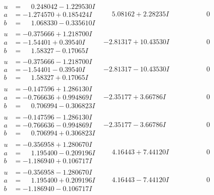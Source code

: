\documentclass[1p]{elsarticle_modified}
\theoremstyle{definition}
\begin{document}
$$\begin{array}{c|c|c}
\begin{aligned}
u &= \phantom{-}0.248042 - 1.229530 I \\
a &= -1.274570 + 0.185424 I \\
b &= \phantom{-}1.068330 - 0.335610 I\end{aligned}
 & \phantom{-}5.08162 + 2.28235 I & \phantom{-0.000000 } 0 \\ \hline\begin{aligned}
u &= -0.375666 + 1.218700 I \\
a &= -1.54401 + 0.39540 I \\
b &= \phantom{-}1.58327 - 0.17065 I\end{aligned}
 & -2.81317 + 10.43530 I & \phantom{-0.000000 } 0 \\ \hline\begin{aligned}
u &= -0.375666 - 1.218700 I \\
a &= -1.54401 - 0.39540 I \\
b &= \phantom{-}1.58327 + 0.17065 I\end{aligned}
 & -2.81317 - 10.43530 I & \phantom{-0.000000 } 0 \\ \hline\begin{aligned}
u &= -0.147596 + 1.286130 I \\
a &= -0.766636 + 0.994869 I \\
b &= \phantom{-}0.706994 - 0.306823 I\end{aligned}
 & -2.35177 + 3.66786 I & \phantom{-0.000000 } 0 \\ \hline\begin{aligned}
u &= -0.147596 - 1.286130 I \\
a &= -0.766636 - 0.994869 I \\
b &= \phantom{-}0.706994 + 0.306823 I\end{aligned}
 & -2.35177 - 3.66786 I & \phantom{-0.000000 } 0 \\ \hline\begin{aligned}
u &= -0.356958 + 1.280670 I \\
a &= \phantom{-}1.195400 - 0.209196 I \\
b &= -1.186940 + 0.106717 I\end{aligned}
 & \phantom{-}4.16443 + 7.44120 I & \phantom{-0.000000 } 0 \\ \hline\begin{aligned}
u &= -0.356958 - 1.280670 I \\
a &= \phantom{-}1.195400 + 0.209196 I \\
b &= -1.186940 - 0.106717 I\end{aligned}
 & \phantom{-}4.16443 - 7.44120 I & \phantom{-0.000000 } 0\\

\end{array}$$
\end{document}
